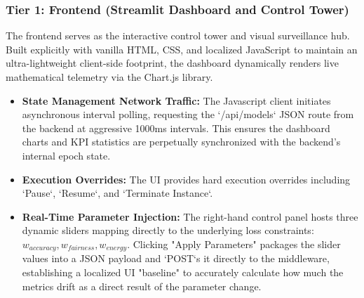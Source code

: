 \documentclass[12pt,a4paper]{article}
\begin{document}
\subsubsection{Tier 1: Frontend (Streamlit Dashboard and Control Tower)}
The frontend serves as the interactive control tower and visual surveillance hub. Built explicitly with vanilla HTML, CSS, and localized JavaScript to maintain an ultra-lightweight client-side footprint, the dashboard dynamically renders live mathematical telemetry via the Chart.js library. 
\begin{itemize}
    \item \textbf{State Management Network Traffic:} The Javascript client initiates asynchronous interval polling, requesting the `/api/models` JSON route from the backend at aggressive 1000ms intervals. This ensures the dashboard charts and KPI statistics are perpetually synchronized with the backend's internal epoch state.
    \item \textbf{Execution Overrides:} The UI provides hard execution overrides including `Pause`, `Resume`, and `Terminate Instance`. 
    \item \textbf{Real-Time Parameter Injection:} The right-hand control panel hosts three dynamic sliders mapping directly to the underlying loss constraints: $w_{accuracy}, w_{fairness}, w_{energy}$. Clicking "Apply Parameters" packages the slider values into a JSON payload and `POST`s it directly to the middleware, establishing a localized UI "baseline" to accurately calculate how much the metrics drift as a direct result of the parameter change.
\end{itemize}
\end{document}
